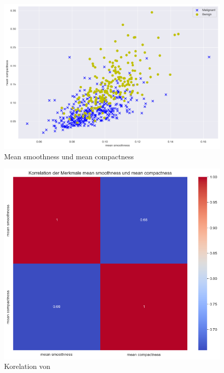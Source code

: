 \documentclass[a4paper,12pt]{article}
\begin{document}
\begin{figure}[H]
    \centering
    \includegraphics[width=\textwidth]{graph.png}
    \caption{Mean smoothness und mean compactness}
    \label{fig:graph}
\end{figure}
\begin{figure}[H]
    \centering
    \includegraphics[width=\textwidth]{korrelation.png}
    \caption{Korelation von }
    \label{fig:korrelation}
\end{figure}
\end{document}

